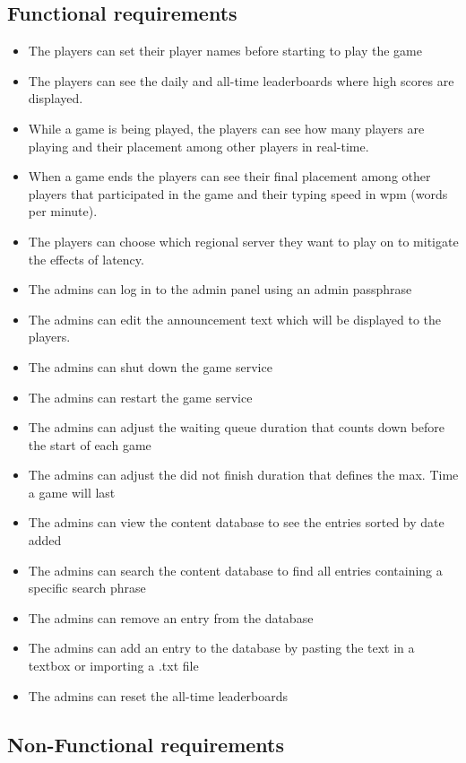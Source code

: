 \documentclass{article}
\begin{document}
\subsection{Functional requirements}

\begin{itemize}
	\item The players can set their player names before starting to play the game
	\item The players can see the daily and all-time leaderboards where high scores are displayed.
	\item While a game is being played, the players can see how many players are playing and their placement among other players in real-time.
	\item When a game ends the players can see their final placement among other players that participated in the game and their typing speed in wpm (words per minute).
	\item The players can choose which regional server they want to play on to mitigate the effects of latency.
	\item The admins can log in to the admin panel using an admin passphrase
	\item The admins can edit the announcement text which will be displayed to the players.
	\item The admins can shut down the game service
	\item The admins can restart the game service
	\item The admins can adjust the waiting queue duration that counts down before the start of each game
	\item The admins can adjust the did not finish duration that defines the max. Time a game will last
	\item The admins can view the content database to see the entries sorted by date added
	\item The admins can search the content database to find all entries containing a specific search phrase
	\item The admins can remove an entry from the database
	\item The admins can add an entry to the database by pasting the text in a textbox or importing a .txt file
	\item The admins can reset the all-time leaderboards
\end{itemize}

\subsection{Non-Functional requirements}
\end{document}
